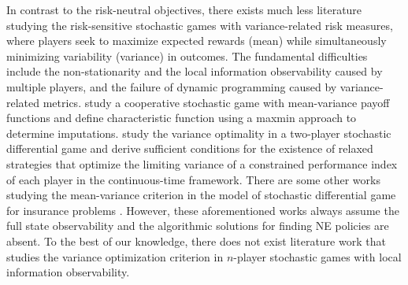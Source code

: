 \documentclass[12pt]{article}
\begin{document}
In contrast to the risk-neutral objectives, there exists much less
literature studying the risk-sensitive stochastic games with
variance-related risk measures, where players seek to maximize
expected rewards (mean) while simultaneously minimizing variability
(variance) in outcomes. The fundamental difficulties include the
non-stationarity and the local information observability caused by
multiple players, and the failure of dynamic programming caused by
variance-related metrics. \cite{Parilina21} study a cooperative
stochastic game with mean-variance payoff functions and define
characteristic function using a maxmin approach to determine
imputations. \cite{Escobedo-Trujillo24} study the variance
optimality in a two-player stochastic differential game and derive
sufficient conditions for the existence of relaxed strategies that
optimize the limiting variance of a constrained performance index of
each player in the continuous-time framework. %
There are some other works studying the mean-variance criterion in
the model of stochastic differential game for insurance problems
\citep{Li22}. However, these aforementioned works always assume the
full state observability and the algorithmic solutions for finding
NE policies are absent. To the best of our knowledge, there does not
exist literature work that studies the variance optimization
criterion in $n$-player stochastic games with local information
observability.
\end{document}
